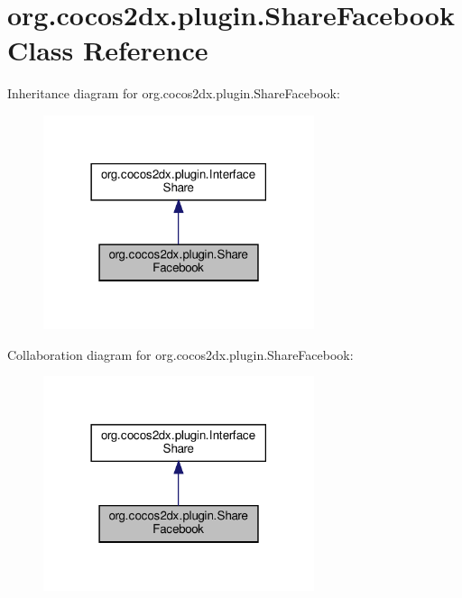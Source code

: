\hypertarget{classorg_1_1cocos2dx_1_1plugin_1_1ShareFacebook}{}\section{org.\+cocos2dx.\+plugin.\+Share\+Facebook Class Reference}
\label{classorg_1_1cocos2dx_1_1plugin_1_1ShareFacebook}


Inheritance diagram for org.\+cocos2dx.\+plugin.\+Share\+Facebook\+:
\nopagebreak
\begin{figure}[H]
\begin{center}
\leavevmode
\includegraphics[width=225pt]{classorg_1_1cocos2dx_1_1plugin_1_1ShareFacebook__inherit__graph}
\end{center}
\end{figure}


Collaboration diagram for org.\+cocos2dx.\+plugin.\+Share\+Facebook\+:
\nopagebreak
\begin{figure}[H]
\begin{center}
\leavevmode
\includegraphics[width=225pt]{classorg_1_1cocos2dx_1_1plugin_1_1ShareFacebook__coll__graph}
\end{center}
\end{figure}
